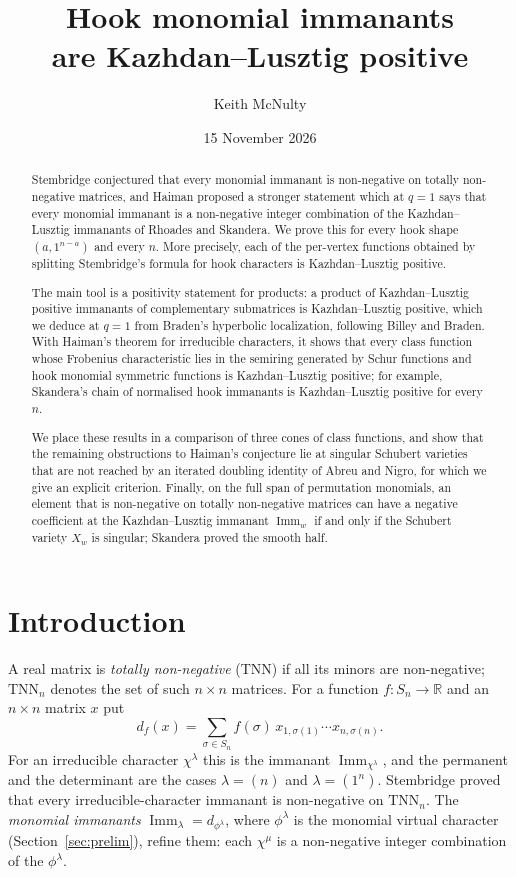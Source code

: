 \documentclass[11pt]{amsart}
\title[Hook monomial immanants are Kazhdan--Lusztig positive]{Hook monomial immanants\\ are Kazhdan--Lusztig positive}
\author{Keith McNulty}
\date{15 November 2026}
\theoremstyle{definition}
\theoremstyle{remark}
\newcommand{\R}{\mathbb{R}}
\newcommand{\Imm}{\operatorname{Imm}}
\newcommand{\TNN}{\mathrm{TNN}}
\begin{document}
\begin{abstract}
Stembridge conjectured that every monomial immanant is non-negative on totally non-negative matrices, and Haiman proposed a stronger statement which at $q=1$ says that every monomial immanant is a non-negative integer combination of the Kazhdan--Lusztig immanants of Rhoades and Skandera. We prove this for every hook shape $(a,1^{n-a})$ and every $n$. More precisely, each of the per-vertex functions obtained by splitting Stembridge's formula for hook characters is Kazhdan--Lusztig positive.

The main tool is a positivity statement for products: a product of Kazhdan--Lusztig positive immanants of complementary submatrices is Kazhdan--Lusztig positive, which we deduce at $q=1$ from Braden's hyperbolic localization, following Billey and Braden. With Haiman's theorem for irreducible characters, it shows that every class function whose Frobenius characteristic lies in the semiring generated by Schur functions and hook monomial symmetric functions is Kazhdan--Lusztig positive; for example, Skandera's chain of normalised hook immanants is Kazhdan--Lusztig positive for every $n$.

We place these results in a comparison of three cones of class functions, and show that the remaining obstructions to Haiman's conjecture lie at singular Schubert varieties that are not reached by an iterated doubling identity of Abreu and Nigro, for which we give an explicit criterion. Finally, on the full span of permutation monomials, an element that is non-negative on totally non-negative matrices can have a negative coefficient at the Kazhdan--Lusztig immanant $\Imm_w$ if and only if the Schubert variety $X_w$ is singular; Skandera proved the smooth half.
\end{abstract}

\maketitle

\section{Introduction}\label{sec:intro}

A real matrix is \emph{totally non-negative} (TNN) if all its minors are non-negative; $\TNN_n$ denotes the set of such $n\times n$ matrices. For a function $f\colon S_n\to\R$ and an $n\times n$ matrix $x$ put
\[
  d_f(x)=\sum_{\sigma\in S_n} f(\sigma)\,x_{1,\sigma(1)}\cdots x_{n,\sigma(n)} .
\]
For an irreducible character $\chi^\lambda$ this is the immanant $\Imm_{\chi^\lambda}$, and the permanent and the determinant are the cases $\lambda=(n)$ and $\lambda=(1^n)$. Stembridge \cite{Ste91} proved that every irreducible-character immanant is non-negative on $\TNN_n$. The \emph{monomial immanants} $\Imm_\lambda=d_{\phi^\lambda}$, where $\phi^\lambda$ is the monomial virtual character (Section~\ref{sec:prelim}), refine them: each $\chi^\mu$ is a non-negative integer combination of the $\phi^\lambda$.
\end{document}
